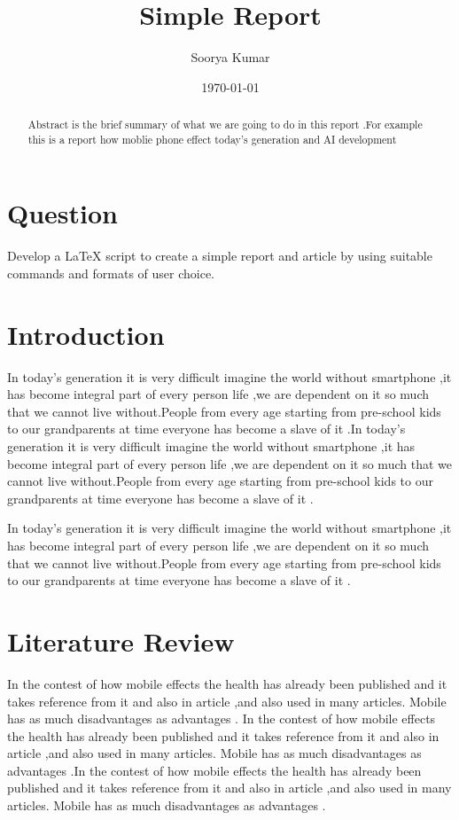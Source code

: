 \documentclass{article}
\title{Simple Report}
\author{Soorya Kumar}
\date{\today}
\begin{document}
	\maketitle
	
	\section*{Question}
		{\large Develop a LaTeX script to create a simple report and article by using suitable commands and formats of user choice.}
		
	\begin{abstract}
		Abstract is the brief summary of what we are going to do in this report .For example this is a report how moblie phone effect today's generation and AI development
	\end{abstract}
	
	\section{Introduction}
	In today's generation it is very difficult imagine the world without smartphone ,it has become integral part of every person life ,we are dependent on it so much that we cannot live without.People from every age starting from pre-school kids to our grandparents at time everyone has become a slave of it .In today's generation it is very difficult imagine the world without smartphone ,it has become integral part of every person life ,we are dependent on it so much that we cannot live without.People from every age starting from pre-school kids to our grandparents at time everyone has become a slave of it .
	
	In today's generation it is very difficult imagine the world without smartphone ,it has become integral part of every person life ,we are dependent on it so much that we cannot live without.People from every age starting from pre-school kids to our grandparents at time everyone has become a slave of it .
	
	\section{Literature Review}
	In the contest of how mobile effects the health has already been published and it takes reference from it \cite{lecun2015deep}
	and also in article \cite{goodfellow2016deep},and also used in many articles. Mobile has as much disadvantages as advantages .
	In the contest of how mobile effects the health has already been published and it takes reference from it \cite{lecun2015deep}
	and also in article \cite{goodfellow2016deep},and also used in many articles. Mobile has as much disadvantages as advantages .In the contest of how mobile effects the health has already been published and it takes reference from it \cite{lecun2015deep}
	and also in article \cite{goodfellow2016deep},and also used in many articles. Mobile has as much disadvantages as advantages .
	
\end{document}
